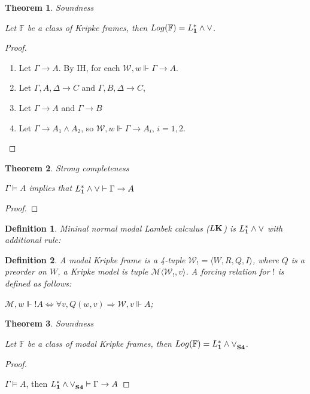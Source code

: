 \documentclass[a4paper]{article}
\theoremstyle{defin}
\newtheorem{defin}{Definition}
\theoremstyle{theorem}
\newtheorem{theorem}{Theorem}
\theoremstyle{prop}
\theoremstyle{lemma}
\theoremstyle{ex}
\theoremstyle{col}
\begin{document}
\begin{theorem} Soundness
$ $

  Let $\mathbb{F}$ be a class of Kripke frames, then $Log(\mathbb{F}) = L^{*}_{\bf 1} \land \lor$.
\end{theorem}

\begin{proof}
$ $

  \begin{enumerate}
  \item Let $\Gamma \rightarrow A$. By IH, for each $\mathcal{W}, w \Vdash \Gamma \rightarrow A$.
  \item Let $\Gamma, A, \Delta \rightarrow C$ and $\Gamma, B, \Delta \rightarrow C$,
  \item Let $\Gamma \rightarrow A$ and $\Gamma \rightarrow B$
  \item Let $\Gamma \rightarrow A_1 \land A_2$, so $\mathcal{W}, w \Vdash \Gamma \rightarrow A_i$, $i = 1,2$.
  \end{enumerate}
\end{proof}

\begin{theorem} Strong completeness
$ $

  $\Gamma \models A$ implies that $L^{*}_{\bf 1} \land \lor \vdash \Gamma \rightarrow A$
\end{theorem}

\begin{proof}
\end{proof}

\begin{defin}
  Mininal normal modal Lambek calculus ($L{\bf K}$) is $L^{*}_{\bf 1} \land \lor$ with additional rule:

  \begin{prooftree}
  \end{prooftree}
\end{defin}

\begin{defin}
  A modal Kripke frame is a 4-tuple $\mathcal{W}_{!} = \langle W, R, Q, I \rangle$, where $Q$ is a preorder on $W$,
  a Kripke model is tuple $\mathcal{M} \langle \mathcal{W}_{!}, v \rangle$. A forcing relation for $!$ is defined as follows:
  \item $\mathcal{M}, w \Vdash !A \Leftrightarrow \forall v, Q(w, v) \Rightarrow \mathcal{W}, v \Vdash A$;
\end{defin}

\begin{theorem} Soundness
  $ $

  Let $\mathbb{F}$ be a class of modal Kripke frames, then $Log(\mathbb{F}) = {L^{*}_{\bf 1} \land \lor}_{\bf S4}$.
\end{theorem}

\begin{proof}
  $ $

  $\Gamma \models A$, then ${L^{*}_{\bf 1} \land \lor}_{\bf S4} \vdash \Gamma \rightarrow A$
\end{proof}
\end{document}
